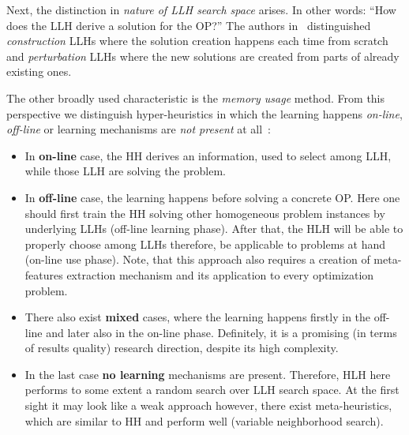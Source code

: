 Next, the distinction in \emph{nature of LLH search space} arises. 
In other words: ``How does the LLH derive a solution for the OP?'' The authors in~\cite{burke2013hyper,burke2019classification,drake2019recent} distinguished \emph{construction} LLHs where the solution creation happens each time from scratch and \emph{perturbation} LLHs where the new solutions are created from parts of already existing ones.

The other broadly used characteristic is the \emph{memory usage} method. 
From this perspective we distinguish hyper-heuristics in which the learning happens \emph{on-line}, \emph{off-line} or learning mechanisms are \emph{not present} at all~\cite{ryser2014review,burke2019classification}:
\begin{itemize}
	\item In \textbf{on-line} case, the HH derives an information, used to select among LLH, while those LLH are solving the problem.

	\item In \textbf{off-line} case, the learning happens before solving a concrete OP. Here one should first train the HH solving other homogeneous problem instances by underlying LLHs (off-line learning phase). After that, the HLH will be able to properly choose among LLHs therefore, be applicable to problems at hand (on-line use phase). Note, that this approach also requires a creation of meta-features extraction mechanism and its application to every optimization problem.

	\item There also exist \textbf{mixed} cases, where the learning happens firstly in the off-line and later also in the on-line phase. Definitely, it is a promising (in terms of results quality) research direction, despite its high complexity.
	
	\item In the last case \textbf{no learning} mechanisms are present. Therefore, HLH here performs to some extent a random search over LLH search space. At the first sight it may look like a weak approach however, there exist meta-heuristics, which are similar to HH and perform well (variable neighborhood search).
\end{itemize}



